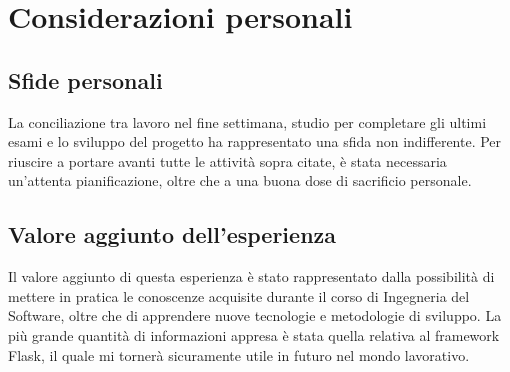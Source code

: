 \documentclass[12pt,a4paper,oneside]{report}
\begin{document}
\section{Considerazioni personali}
\subsection{Sfide personali}
La conciliazione tra lavoro nel fine settimana, studio per completare gli ultimi esami e lo sviluppo del progetto ha rappresentato una sfida non indifferente.
Per riuscire a portare avanti tutte le attività sopra citate, è stata necessaria un'attenta pianificazione, oltre che a una buona dose di sacrificio personale.
\subsection{Valore aggiunto dell'esperienza}
Il valore aggiunto di questa esperienza è stato rappresentato dalla possibilità di mettere in pratica le conoscenze acquisite durante il corso di Ingegneria del Software, oltre che di apprendere nuove tecnologie e metodologie di sviluppo.
La più grande quantità di informazioni appresa è stata quella relativa al framework Flask, il quale mi tornerà sicuramente utile in futuro nel mondo lavorativo.
\appendix
\end{document}
